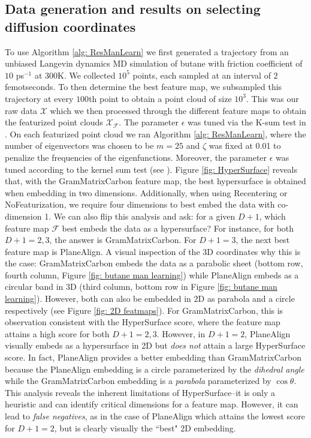 \documentclass[reqno, 12pt]{article}
\begin{document}
\subsection{Data generation and results on selecting diffusion coordinates} To use Algorithm \ref{alg: ResManLearn} we first generated a trajectory from an unbiased Langevin dynamics MD simulation of butane with friction coefficient of $10$ ps$^{-1}$ at 300K. We collected $10^5$ points, each sampled at an interval of $2$ femotseconds. To then determine the best feature map, we subsampled this trajectory at every $100$th point to obtain a point cloud of size $10^3$. This was our raw data $\mathcal{X}$ which we then processed through the different feature maps to obtain the featurized point clouds $\mathcal{X}_{\mathcal{F}}$. The parameter $\epsilon$ was tuned via the K-sum test in \cite{evans2022computing}. On each featurized point cloud we ran Algorithm \ref{alg: ResManLearn}, where the number of eigenvectors was chosen to be $m = 25$ and $\zeta$ was fixed at 0.01 to penalize the frequencies of the eigenfunctions. Moreover, the parameter $\epsilon$ was tuned according to the kernel sum test (see \cite{evans2022computing}). Figure \ref{fig: HyperSurface} reveals that, with the {\sf GramMatrixCarbon} feature map, the best hypersurface is obtained when embedding in two dimensions. Additionally, when using {\sf Recentering} or {\sf NoFeaturization}, we require four dimensions to best embed the data with co-dimension 1. We can also flip this analysis and ask: for a given $D+1$, which feature map $\mathcal{F}$ best embeds the data as a hypersurface? For instance, for both $D+1= 2,3$, the answer is {\sf GramMatrixCarbon}. For $D+1 = 3$, the next best feature map is {\sf PlaneAlign}. A visual inspection of the 3D coordinates why this is the case: {\sf GramMatrixCarbon} embeds the data as a parabolic sheet (bottom row, fourth column, Figure \ref{fig: butane man learning}) while {\sf PlaneAlign} embeds as a circular band in 3D (third column, bottom row in Figure \ref{fig: butane man learning}). However, both can also be embedded in 2D as parabola and a circle respectively (see Figure \ref{fig: 2D featmaps}). For {\sf GramMatrixCarbon}, this is observation consistent with the HyperSurface score, where the feature map attains a high score for both $D+1=2,3$. However, in $D+1=2$, {\sf PlaneAlign} visually embeds as a hypersurface in 2D but \emph{does not} attain a large HyperSurface score. In fact, {\sf PlaneAlign} provides a better embedding than {\sf GramMatrixCarbon} because the {\sf PlaneAlign} embedding is a circle parameterized by the \emph{dihedral angle} while the GramMatrixCarbon embedding is a \emph{parabola} parameterized by $\cos \theta$. This analysis reveals the inherent limitations of HyperSurface--it is only a heuristic and can identify critical dimensions for a feature map. However, it can lead to \emph{false negatives}, as in the case of {\sf PlaneAlign} which attains the lowest score for $D+1=2$, but is clearly visually the ``best" 2D embedding. 
\end{document}
